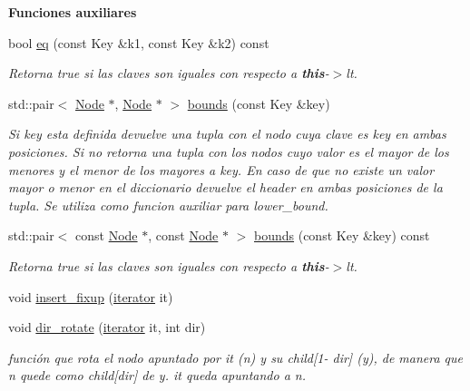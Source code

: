 \begin{Indent}{\bf \-Funciones auxiliares}\par
\begin{DoxyCompactItemize}
\item 
bool \hyperlink{classaed2_1_1map_ab45cb28bb215cd229383d88b96b3f624_ab45cb28bb215cd229383d88b96b3f624}{eq} (const \-Key \&k1, const \-Key \&k2) const 
\begin{DoxyCompactList}\small\item\em \-Retorna true si las claves son iguales con respecto a {\bfseries this}-\/$>$lt. \end{DoxyCompactList}\item 
std\-::pair$<$ \hyperlink{structaed2_1_1map_1_1Node}{\-Node} $\ast$, \hyperlink{structaed2_1_1map_1_1Node}{\-Node} $\ast$ $>$ \hyperlink{classaed2_1_1map_aa079b9390f988f97be26fd51ed44a2c9_aa079b9390f988f97be26fd51ed44a2c9}{bounds} (const \-Key \&key)
\begin{DoxyCompactList}\small\item\em \-Si key esta definida devuelve una tupla con el nodo cuya clave es key en ambas posiciones. \-Si no retorna una tupla con los nodos cuyo valor es el mayor de los menores y el menor de los mayores a key. \-En caso de que no existe un valor mayor o menor en el diccionario devuelve el header en ambas posiciones de la tupla. \-Se utiliza como funcion auxiliar para lower\-\_\-bound. \end{DoxyCompactList}\item 
std\-::pair$<$ const \hyperlink{structaed2_1_1map_1_1Node}{\-Node} $\ast$, const \*
\hyperlink{structaed2_1_1map_1_1Node}{\-Node} $\ast$ $>$ \hyperlink{classaed2_1_1map_a4d903414b3f1f1e6f785342bb3900572_a4d903414b3f1f1e6f785342bb3900572}{bounds} (const \-Key \&key) const 
\begin{DoxyCompactList}\small\item\em \-Retorna true si las claves son iguales con respecto a {\bfseries this}-\/$>$lt. \end{DoxyCompactList}\item 
void \hyperlink{classaed2_1_1map_ac9197851fe5b217d45d58bbaf3612c75_ac9197851fe5b217d45d58bbaf3612c75}{insert\-\_\-fixup} (\hyperlink{classaed2_1_1map_1_1iterator}{iterator} it)
\item 
void \hyperlink{classaed2_1_1map_a94f2862ada0c9ed4f4457eac42ea8f23_a94f2862ada0c9ed4f4457eac42ea8f23}{dir\-\_\-rotate} (\hyperlink{classaed2_1_1map_1_1iterator}{iterator} it, int dir)
\begin{DoxyCompactList}\small\item\em función que rota el nodo apuntado por it (n) y su child\mbox{[}1-\/ dir\mbox{]} (y), de manera que n quede como child\mbox{[}dir\mbox{]} de y. it queda apuntando a n. \end{DoxyCompactList}\item 

\end{DoxyCompactItemize}
\end{Indent}
